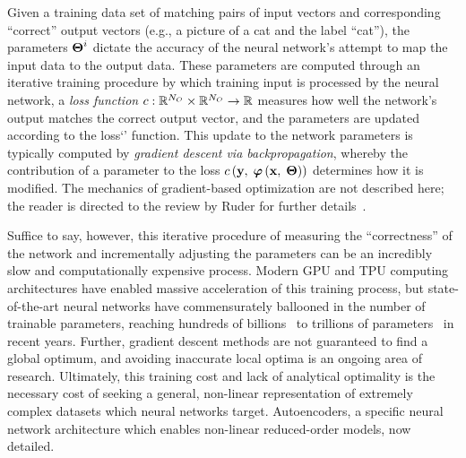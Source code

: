 Given a training data set of matching pairs of input vectors and corresponding ``correct'' output vectors (e.g., a picture of a cat and the label ``cat''), the parameters $\boldsymbol{\Theta}^{i}$ dictate the accuracy of the neural network's attempt to map the input data to the output data. These parameters are computed through an iterative training procedure by which training input is processed by the neural network, a \textit{loss function} $c: \mathbb{R}^{N_{O}} \times \mathbb{R}^{N_{O}} \rightarrow \mathbb{R}$ measures how well the network's output matches the correct output vector, and the parameters are updated according to the loss`' function. This update to the network parameters is typically computed by \textit{gradient descent via backpropagation}, whereby the contribution of a parameter to the loss $c\left(\mathbf{y}, \; \boldsymbol{\varphi}\left({\mathbf{x}, \; \boldsymbol{\Theta}}\right)\right)$ determines how it is modified. The mechanics of gradient-based optimization are not described here; the reader is directed to the review by Ruder for further details~\cite{Ruder2016}.

Suffice to say, however, this iterative procedure of measuring the ``correctness'' of the network and incrementally adjusting the parameters can be an incredibly slow and computationally expensive process. Modern GPU and TPU computing architectures have enabled massive acceleration of this training process, but state-of-the-art neural networks have commensurately ballooned in the number of trainable parameters, reaching hundreds of billions~\cite{Brown2020} to trillions of parameters~\cite{Fedus2022} in recent years. Further, gradient descent methods are not guaranteed to find a global optimum, and avoiding inaccurate local optima is an ongoing area of research. Ultimately, this training cost and lack of analytical optimality is the necessary cost of seeking a general, non-linear representation of extremely complex datasets which neural networks target. Autoencoders, a specific neural network architecture which enables non-linear reduced-order models, now detailed.

